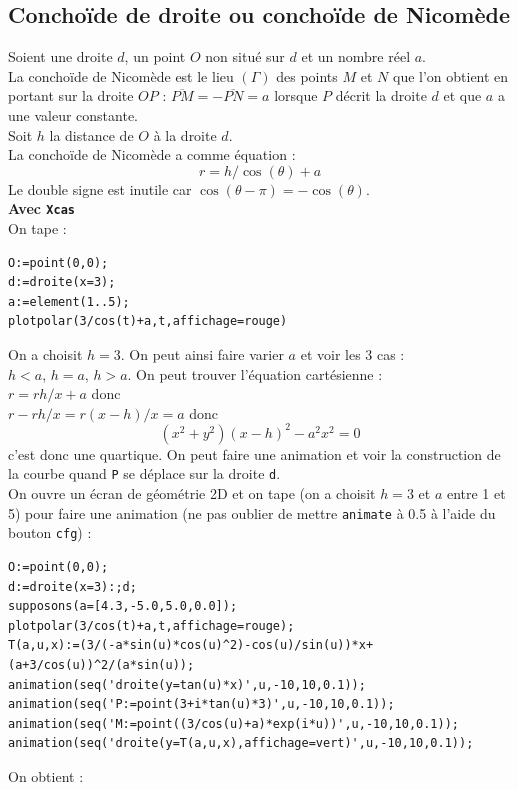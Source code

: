 \documentclass[a4paper,11pt]{book}
\begin{document}
\subsection{Concho\"{i}de de droite ou concho\"{i}de de Nicom\`ede}
Soient une droite $d$, un point $O$ non situ\'e sur $d$ et un nombre r\'eel 
$a$.\\
La concho\"{i}de de Nicom\`ede est le 
lieu $(\Gamma)$ des points $M$ et $N$ que l'on obtient en portant sur la 
droite $OP$ : $\overline{PM}=-\overline{PN}=a$ lorsque $P$ d\'ecrit la droite
$d$ et que $a$ a une valeur constante.\\
Soit $h$ la distance de $O$ \`a la droite $d$.\\
La concho\"{i}de de Nicom\`ede a comme \'equation :\\
$$r=h/\cos(\theta)+a$$
Le double signe est inutile car $\cos(\theta-\pi)=-\cos(\theta)$.\\
{\bf Avec {\tt Xcas}}\\
On tape :\\
\begin{verbatim}
O:=point(0,0);
d:=droite(x=3);
a:=element(1..5);
plotpolar(3/cos(t)+a,t,affichage=rouge)
\end{verbatim}
On a choisit $h=3$. On peut ainsi faire varier $a$ et voir les 3 cas :\\
$h<a$, $h=a$, $h>a$.
On peut trouver l'\'equation cart\'esienne :\\
$r=rh/x+a$ donc\\
$r-rh/x=r(x-h)/x=a$ donc\\
$$(x^2+y^2)(x-h)^2-a^2x^2=0$$
c'est donc une quartique.
On peut faire une animation et voir la construction de la courbe quand 
{\tt P} se d\'eplace sur la droite {\tt d}.\\
On ouvre un \'ecran de g\'eom\'etrie 2D et on tape (on a choisit $h=3$ et $a$ 
entre 1 et 5) pour faire une animation (ne pas oublier de mettre {\tt animate} 
\`a 0.5 \`a l'aide du bouton  {\tt cfg}) :
\begin{verbatim}
O:=point(0,0);
d:=droite(x=3):;d;
supposons(a=[4.3,-5.0,5.0,0.0]);
plotpolar(3/cos(t)+a,t,affichage=rouge);
T(a,u,x):=(3/(-a*sin(u)*cos(u)^2)-cos(u)/sin(u))*x+
(a+3/cos(u))^2/(a*sin(u));
animation(seq('droite(y=tan(u)*x)',u,-10,10,0.1));
animation(seq('P:=point(3+i*tan(u)*3)',u,-10,10,0.1));
animation(seq('M:=point((3/cos(u)+a)*exp(i*u))',u,-10,10,0.1));
animation(seq('droite(y=T(a,u,x),affichage=vert)',u,-10,10,0.1));
\end{verbatim}
On obtient :\\
\end{document}
